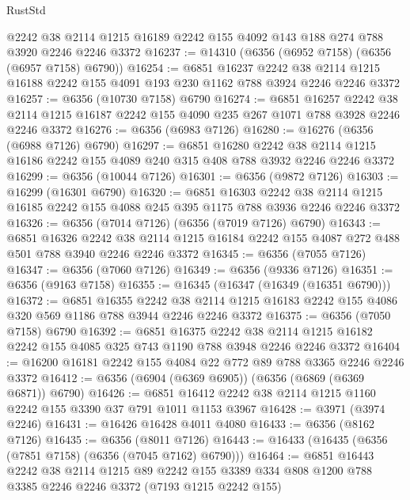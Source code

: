 \begin{lexlean}{RustStd}
\begin{coremodule}
{\begin{coremodule}
{{{{{{{{{{{{{{{{{{{{{{{{{{    @2242
    @38
    @2114
    @1215
    @16189
    @2242
    @155
    @4092
    @143
    @188
    @274
    @788
    @3920
    @2246
    @2246
    @3372
@16237 := @14310 (@6356 (@6952 @7158) (@6356 (@6957 @7158) @6790))
@16254 := @6851
    @16237
    @2242
    @38
    @2114
    @1215
    @16188
    @2242
    @155
    @4091
    @193
    @230
    @1162
    @788
    @3924
    @2246
    @2246
    @3372
@16257 := @6356 (@10730 @7158) @6790
@16274 := @6851
    @16257
    @2242
    @38
    @2114
    @1215
    @16187
    @2242
    @155
    @4090
    @235
    @267
    @1071
    @788
    @3928
    @2246
    @2246
    @3372
@16276 := @6356 (@6983 @7126)
@16280 := @16276 (@6356 (@6988 @7126) @6790)
@16297 := @6851
    @16280
    @2242
    @38
    @2114
    @1215
    @16186
    @2242
    @155
    @4089
    @240
    @315
    @408
    @788
    @3932
    @2246
    @2246
    @3372
@16299 := @6356 (@10044 @7126)
@16301 := @6356 (@9872 @7126)
@16303 := @16299 (@16301 @6790)
@16320 := @6851
    @16303
    @2242
    @38
    @2114
    @1215
    @16185
    @2242
    @155
    @4088
    @245
    @395
    @1175
    @788
    @3936
    @2246
    @2246
    @3372
@16326 := @6356 (@7014 @7126) (@6356 (@7019 @7126) @6790)
@16343 := @6851
    @16326
    @2242
    @38
    @2114
    @1215
    @16184
    @2242
    @155
    @4087
    @272
    @488
    @501
    @788
    @3940
    @2246
    @2246
    @3372
@16345 := @6356 (@7055 @7126)
@16347 := @6356 (@7060 @7126)
@16349 := @6356 (@9336 @7126)
@16351 := @6356 (@9163 @7158)
@16355 := @16345 (@16347 (@16349 (@16351 @6790)))
@16372 := @6851
    @16355
    @2242
    @38
    @2114
    @1215
    @16183
    @2242
    @155
    @4086
    @320
    @569
    @1186
    @788
    @3944
    @2246
    @2246
    @3372
@16375 := @6356 (@7050 @7158) @6790
@16392 := @6851
    @16375
    @2242
    @38
    @2114
    @1215
    @16182
    @2242
    @155
    @4085
    @325
    @743
    @1190
    @788
    @3948
    @2246
    @2246
    @3372
@16404 := @16200 @16181 @2242 @155 @4084 @22 @772 @89 @788 @3365 @2246 @2246 @3372
@16412 := @6356 (@6904 (@6369 @6905)) (@6356 (@6869 (@6369 @6871)) @6790)
@16426 := @6851 @16412 @2242 @38 @2114 @1215 @1160 @2242 @155 @3390 @37 @791 @1011 @1153 @3967
@16428 := @3971 (@3974 @2246)
@16431 := @16426 @16428 @4011 @4080
@16433 := @6356 (@8162 @7126)
@16435 := @6356 (@8011 @7126)
@16443 := @16433 (@16435 (@6356 (@7851 @7158) (@6356 (@7045 @7162) @6790)))
@16464 := @6851
    @16443
    @2242
    @38
    @2114
    @1215
    @89
    @2242
    @155
    @3389
    @334
    @808
    @1200
    @788
    @3385
    @2246
    @2246
    @3372
    (@7193 @1215 @2242 @155)
}}}}}}}}}}}}}}}}}}}}}}}}}}
\end{coremodule}}
\end{coremodule}
\end{lexlean}
